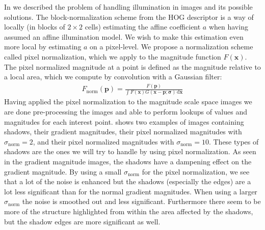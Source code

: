 \documentclass[thesis.tex]{subfiles}
\def\x{\mathbf{x}}
\def\p{\mathbf{p}}
\begin{document}
In  we described the problem of handling illumination in images and its possible solutions. The block-normalization scheme from the HOG descriptor \cite{dalal2005histograms} is a way of locally (in blocks of $2\times2$ cells) estimating the affine coefficient $a$ when having assumed an affine illumination model. We wish to make this estimation even more local by estimating $a$ on a pixel-level. We propose a normalization scheme called pixel normalization, which we apply to the magnitude function $F(\x)$.
The pixel normalized magnitude at a point is defined as the magnitude relative to a local area, which we compute by convolution with a Gaussian filter:
%
\begin{align}
F_\text{norm}(\p) = \frac{F(\p)}{\int F(\x) G(\x - \p; \boldsymbol{\sigma}) \,\text{d} \x}
\end{align}
%
Having applied the pixel normalization to the magnitude scale space images we are done pre-processing the images and able to perform lookups of values and magnitudes for each interest point.
 shows two examples of images containing shadows, their gradient magnitudes, their pixel normalized magnitudes with $\sigma_\text{norm} = 2$, and their pixel normalized magnitudes with $\sigma_\text{norm} = 10$. These types of shadows are the ones we will try to handle by using pixel normalization. As seen in the gradient magnitude images, the shadows have a dampening effect on the gradient magnitude. By using a small $\sigma_\text{norm}$ for the pixel normalization, we see that a lot of the noise is enhanced but the shadows (especially the edges) are a lot less significant than for the normal gradient magnitudes. When using a larger $\sigma_\text{norm}$ the noise is smoothed out and less significant. Furthermore there seem to be more of the structure highlighted from within the area affected by the shadows, but the shadow edges are more significant as well.
\end{document}
